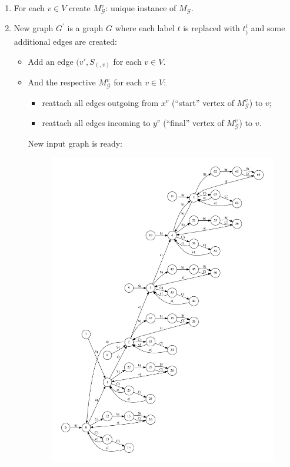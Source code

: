\begin{enumerate}
\item For each $v \in V$ create $M_{\mathcal{G}}^v$: unique instance of $M_{\mathcal{G}}$.
\item New graph $G^{'}$ is a graph $G$ where each label $t$ is replaced with $t_{)}^i$ and some additional edges are created:
\begin{itemize}
\item Add an edge $(v', S_(, v)$ for each $v \in V$. 
\item And the respective $M_{\mathcal{G}}^v$ for each $v \in V$:
  \begin{itemize}
    \item reattach all edges outgoing from $x^v$ (``start'' vertex of $M_{\mathcal{G}}^v$) to $v$;
    \item reattach all edges incoming to $y^v$ (``final'' vertex of $M_{\mathcal{G}}^v$) to $v$.    
  \end{itemize}
  New input graph is ready:

\begin{figure}  
  \includegraphics[width=.9\textwidth]{dot/input_new_min.pdf}
 

\end{figure}
\end{itemize}
\end{enumerate}
